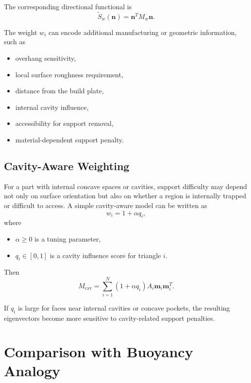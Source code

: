 \documentclass[11pt,a4paper]{article}
\begin{document}
The corresponding directional functional is
\begin{equation}
\widetilde S_w(\bm n)
=
\bm n^T M_w \bm n.
\end{equation}

The weight $w_i$ can encode additional manufacturing or geometric information, such as

\begin{itemize}
\item overhang sensitivity,
\item local surface roughness requirement,
\item distance from the build plate,
\item internal cavity influence,
\item accessibility for support removal,
\item material-dependent support penalty.
\end{itemize}

\subsection{Cavity-Aware Weighting}

For a part with internal concave spaces or cavities, support difficulty may depend not only on surface orientation but also on whether a region is internally trapped or difficult to access.
A simple cavity-aware model can be written as
\begin{equation}
w_i
=
1+\alpha q_i,
\end{equation}
where

\begin{itemize}
\item $\alpha\geq 0$ is a tuning parameter,
\item $q_i\in[0,1]$ is a cavity influence score for triangle $i$.
\end{itemize}

Then
\begin{equation}
M_{\text{cav}}
=
\sum_{i=1}^{N}
(1+\alpha q_i)
A_i
\bm m_i\bm m_i^T.
\end{equation}

If $q_i$ is large for faces near internal cavities or concave pockets, the resulting eigenvectors become more sensitive to cavity-related support penalties.

\section{Comparison with Buoyancy Analogy}
\end{document}
